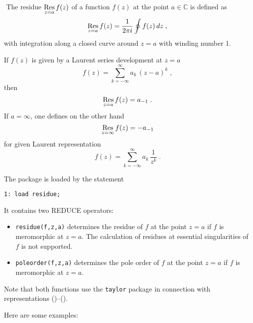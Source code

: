
\ifdefined\VerbMath
\(
\newcommand{\Res}{\mathop{\rm Res}\limits}
\)%
\else
\newcommand{\Res}{\mathop{\rm Res}\limits}
\fi
The residue
$\Res_{z=a} f(z)$ of a function $f(z)$ at the point $a\in\mathbb{C}$ is defined
as
\[
\Res_{z=a} f(z)=
\frac{1}{2 \pi i}\oint f(z)\,dz
\;,
\]
with integration along a closed curve around $z=a$ with winding number 1.

If $f(z)$ is given by a Laurent series development at $z=a$
\[
f(z)=\sum_{k=-\infty}^\infty a_k\,(z-a)^k
\;,
\]
then
\begin{equation}
\Res\limits_{z=a} f(z)=a_{-1}
\;.
\label{eq:Laurent}
\end{equation}
If $a=\infty$, one defines on the other hand
\begin{equation}
\Res\limits_{z=\infty} f(z)=-a_{-1}
\label{eq:Laurent2}
\end{equation}
for given Laurent representation
\[
f(z)=\sum_{k=-\infty}^\infty a_k\,\frac{1}{z^k}
\;.
\]

The package is loaded by the statement

\begin{verbatim}
1: load residue;
\end{verbatim}

It contains two REDUCE operators:

\begin{itemize}
\item
{\tt residue(f,z,a)} determines the residue of $f$ at the point $z=a$
if $f$ is meromorphic at $z=a$. The calculation of residues at essential
singularities of $f$ is not supported.
\item
{\tt poleorder(f,z,a)} determines the pole order of $f$ at the point $z=a$
if $f$ is meromorphic at $z=a$.
\end{itemize}
Note that both functions use the {\tt taylor} package in
connection with representations ()--().

Here are some examples:

